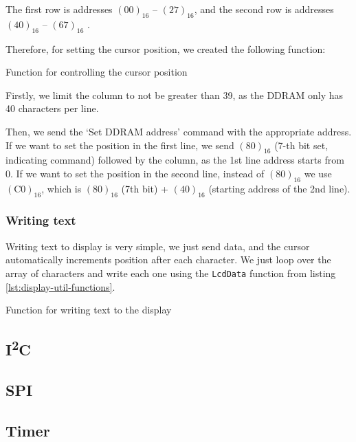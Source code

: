 \documentclass[10pt]{article}
\newcommand{\code}[3]{}
\begin{document}
    The first row is addresses $(00)_{16}$ -- $(27)_{16}$, and the second row is addresses $(40)_{16}$ -- $(67)_{16}$ \cite[p.11]{display-man}.

    Therefore, for setting the cursor position, we created the following function:
    \begin{program}[H]
        \code{108}{116}{display.h}
        \caption{Function for controlling the cursor position}
    \end{program}

    Firstly, we limit the column to not be greater than 39, as the DDRAM only has 40 characters per line.

    Then, we send the `Set DDRAM address' command with the appropriate address.
    If we want to set the position in the first line, we send $(80)_{16}$ (7-th bit set, indicating command) followed by the column, as the 1st line address starts from 0.
    If we want to set the position in the second line, instead of $(80)_{16}$ we use $(\mathrm{C0})_{16}$, which is $(80)_{16}$ (7th bit) + $(40)_{16}$ (starting address of the 2nd line).

    \subsubsection{Writing text}

    Writing text to display is very simple, we just send data, and the cursor automatically increments position after each character.
    We just loop over the array of characters and write each one using the \texttt{LcdData} function from listing \ref{lst:display-util-functions}.

    \begin{program}[H]
        \code{118}{124}{display.h}
        \caption{Function for writing text to the display}
    \end{program}

    \subsection{I\textsuperscript{2}C}

    \subsection{SPI}

    \subsection{Timer}
\end{document}
